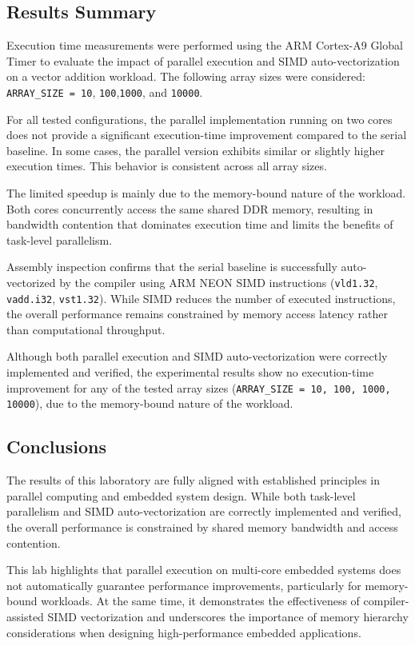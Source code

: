 \subsection*{Results Summary}

Execution time measurements were performed using the ARM Cortex-A9 Global Timer
to evaluate the impact of parallel execution and SIMD auto-vectorization on a
vector addition workload. The following array sizes were considered:
\texttt{ARRAY\_SIZE = 10}, \texttt{100},\texttt{1000}, and \texttt{10000}.

For all tested configurations, the parallel implementation running on two cores
does not provide a significant execution-time improvement compared to the serial
baseline. In some cases, the parallel version exhibits similar or slightly higher
execution times. This behavior is consistent across all array sizes.

The limited speedup is mainly due to the memory-bound nature of the workload.
Both cores concurrently access the same shared DDR memory, resulting in bandwidth
contention that dominates execution time and limits the benefits of task-level
parallelism.

Assembly inspection confirms that the serial baseline is successfully
auto-vectorized by the compiler using ARM NEON SIMD instructions
(\texttt{vld1.32}, \texttt{vadd.i32}, \texttt{vst1.32}). While SIMD reduces the
number of executed instructions, the overall performance remains constrained by
memory access latency rather than computational throughput.

Although both parallel execution and SIMD auto-vectorization were correctly
implemented and verified, the experimental results show no execution-time
improvement for any of the tested array sizes
(\texttt{ARRAY\_SIZE = 10, 100, 1000, 10000}),
due to the memory-bound nature of the workload.

\subsection*{Conclusions}

The results of this laboratory are fully aligned with established principles in
parallel computing and embedded system design. While both task-level parallelism
and SIMD auto-vectorization are correctly implemented and verified, the overall
performance is constrained by shared memory bandwidth and access contention.

This lab highlights that parallel execution on multi-core embedded systems does
not automatically guarantee performance improvements, particularly for
memory-bound workloads. At the same time, it demonstrates the effectiveness of
compiler-assisted SIMD vectorization and underscores the importance of memory
hierarchy considerations when designing high-performance embedded applications.
